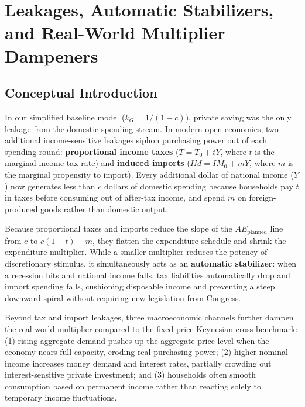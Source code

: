 \documentclass[11pt,letterpaper]{article}
\begin{document}
\section{Leakages, Automatic Stabilizers, and Real-World Multiplier Dampeners}

\subsection*{Conceptual Introduction}
In our simplified baseline model ($k_G = 1/(1 - c)$), private saving was the only leakage from the domestic spending stream. In modern open economies, two additional income-sensitive leakages siphon purchasing power out of each spending round: \textbf{proportional income taxes} ($T = T_0 + tY$, where $t$ is the marginal income tax rate) and \textbf{induced imports} ($IM = IM_0 + mY$, where $m$ is the marginal propensity to import). Every additional dollar of national income ($Y$) now generates less than $c$ dollars of domestic spending because households pay $t$ in taxes before consuming out of after-tax income, and spend $m$ on foreign-produced goods rather than domestic output.

Because proportional taxes and imports reduce the slope of the $AE_{\text{planned}}$ line from $c$ to $c(1 - t) - m$, they flatten the expenditure schedule and shrink the expenditure multiplier. While a smaller multiplier reduces the potency of discretionary stimulus, it simultaneously acts as an \textbf{automatic stabilizer}: when a recession hits and national income falls, tax liabilities automatically drop and import spending falls, cushioning disposable income and preventing a steep downward spiral without requiring new legislation from Congress.

Beyond tax and import leakages, three macroeconomic channels further dampen the real-world multiplier compared to the fixed-price Keynesian cross benchmark: (1) rising aggregate demand pushes up the aggregate price level when the economy nears full capacity, eroding real purchasing power; (2) higher nominal income increases money demand and interest rates, partially crowding out interest-sensitive private investment; and (3) households often smooth consumption based on permanent income rather than reacting solely to temporary income fluctuations.
\end{document}
